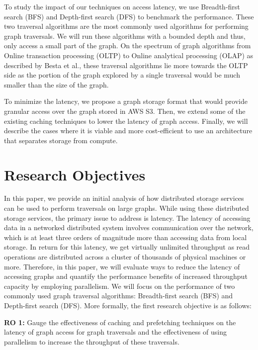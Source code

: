 \medskip
To study the impact of our techniques on access latency, we use
Breadth-first search (BFS) and Depth-first search (DFS) to
benchmark the performance. These two traversal algorithms are the most
commonly used algorithms for performing graph traversals\cite{sahu2017ubiquity}.
We will run these algorithms with a bounded depth and thus, only
access a small part of the graph. On the spectrum of graph algorithms from
Online transaction processing (OLTP)
to Online analytical processing (OLAP) as described by 
Besta et al.\cite{besta2023demystifying}, these 
traversal algorithms lie
more towards the OLTP side as the portion of the graph explored by a single traversal
would be much smaller than the size of the graph.

\medskip
To minimize the latency, we propose a graph storage format that
would provide granular access over the graph stored in AWS S3. Then, we
extend some of the existing caching techniques to lower the latency of
graph access. Finally, we will describe the cases where it is viable and more
cost-efficient to use an architecture that separates storage from compute.

\section{Research Objectives}
In this paper, we provide an initial analysis of how distributed storage services can 
be used to perform traversals on large graphs. While using these distributed storage services, the primary
issue to address is latency. The latency of accessing data in a networked
distributed system involves communication over the network, which is at least three orders of
magnitude more than accessing data from local storage. In return for this latency,
we get virtually unlimited throughput as read operations are distributed across a cluster 
of thousands of physical machines or more. Therefore, in this paper, we will evaluate ways to
reduce the latency of accessing graphs and quantify the performance
benefits of increased throughput capacity by employing parallelism. We will focus on the 
performance of two commonly used graph traversal algorithms: Breadth-first search 
(BFS) and Depth-first search (DFS). More formally, the first research
objective is as follows:
\begin{displayquote}
    \textbf{RO 1:} Gauge the effectiveness of caching and prefetching techniques
    on the latency of graph access for graph traversals and the effectiveness of
    using parallelism to increase the throughput of these traversals.
\end{displayquote}

